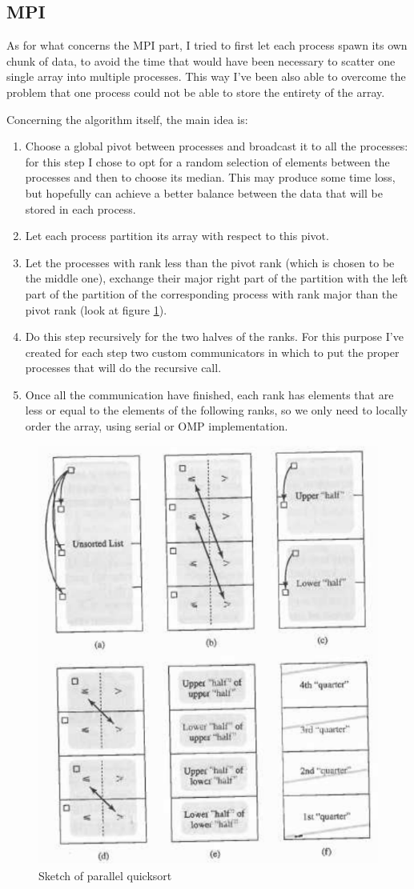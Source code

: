 \documentclass{article}
\begin{document}
	\subsection{MPI}
	As for what concerns the MPI part, I tried to first let each process spawn its own chunk of data, to avoid the time that would have been necessary to scatter one single array into multiple processes. This way I've been also able to overcome the problem that one process could not be able to store the entirety of the array.
	
	Concerning the algorithm itself, the main idea is:
	\begin{enumerate}
		\item Choose a global pivot between processes and broadcast it to all the processes: for this step I chose to opt for a random selection of elements between the processes and then to choose its median. This may produce some time loss, but hopefully can achieve a better balance between the data that will be stored in each process.
		\item Let each process partition its array with respect to this pivot.
		\item Let the processes with rank less than the pivot rank (which is chosen to be the middle one), exchange their major right part of the partition with the left part of the partition of the corresponding process with rank major than the pivot rank (look at figure \ref{fig:parallelquicksort}).
		\item Do this step recursively for the two halves of the ranks. For this purpose I've created for each step two custom communicators in which to put the proper processes that will do the recursive call.
		\item Once all the communication have finished, each rank has elements that are less or equal to the elements of the following ranks, so we only need to locally order the array, using serial or OMP implementation.
	\end{enumerate}
	
	\begin{figure}[h]
		\centering
		\includegraphics[height=0.4\linewidth]{Parallel_quicksort}
		\caption{Sketch of parallel quicksort}
		\label{fig:parallelquicksort}
	\end{figure}
	
\end{document}
